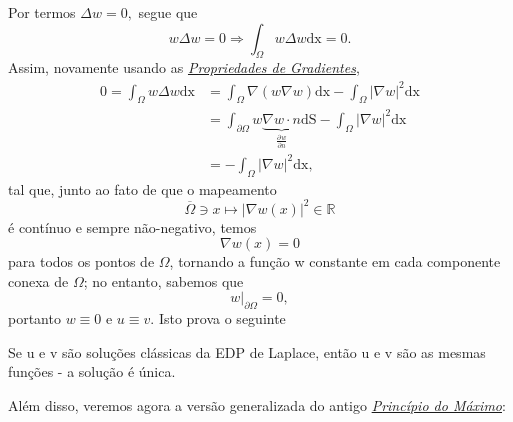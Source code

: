 \documentclass[../pde_notes.tex]{subfiles}
\begin{document}
Por termos \(\Delta w = 0, \) segue que
\[
	w\Delta w = 0 \Rightarrow \int_{\Omega }^{}w\Delta w \mathrm{dx} = 0.
\]
Assim, novamente usando as \hyperlink{gradient_properties}{\textit{Propriedades de Gradientes}},
\begin{align*}
	0 = \int_{\Omega }^{}w\Delta w \mathrm{dx} & = \int_{\Omega }^{}\nabla (w\nabla w) \mathrm{dx} - \int_{\Omega }^{}|\nabla w|^{2} \mathrm{dx}                                                            \\
	                                           & = \int_{\partial \Omega }^{}w \underbrace{\nabla w \cdot n}_{\frac{\partial^{}w}{\partial n^{}}} \mathrm{dS} - \int_{\Omega }^{}|\nabla w|^{2} \mathrm{dx} \\
	                                           & = - \int_{\Omega }^{}|\nabla w|^{2} \mathrm{dx},
\end{align*}
tal que, junto ao fato de que o mapeamento
\[
	\overline{\Omega }\ni x \mapsto |\nabla w(x)|^{2}\in \mathbb{R}
\]
é contínuo e sempre não-negativo, temos
\[
	\nabla w(x) = 0
\]
para todos os pontos de \(\Omega \), tornando a função w constante em cada componente conexa de \(\Omega \); no entanto, sabemos que
\[
	w|_{\partial \Omega } = 0,
\]
portanto \(w\equiv 0\) e \(u\equiv v\). Isto prova o seguinte
\begin{theorem*}
	Se u e v são soluções clássicas da EDP de Laplace, então u e v são as mesmas funções - a solução é única.
\end{theorem*}
Além disso, veremos agora a versão generalizada do antigo \hyperlink{strong_maximum}{\textit{Princípio do Máximo}}:
\end{document}
